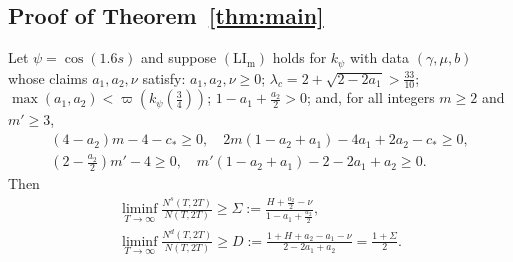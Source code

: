 \subsection{Proof of Theorem~\ref{thm:main}}
\begin{theorem}\label{thm:SigmaD}
Let $\psi=\cos(1.6s)$ and suppose $(\mathrm{LI}_{\mathrm m})$ holds for $k_\psi$ with data $(\gamma,\mu,b)$ whose claims $a_1,a_2,\nu$ satisfy:
$a_1,a_2,\nu\ge0$; $\lambda_c=2+\sqrt{2-2a_1}>\frac{33}{10}$; $\max(a_1,a_2)<\varpi(k_\psi(\frac34))$; $1-a_1+\frac{a_2}2>0$; and, for all integers $m\ge2$
and $m'\ge3$,
\begin{gather*}
(4-a_2)m-4-c_*\ge0,\quad 2m(1-a_2+a_1)-4a_1+2a_2-c_*\ge0,\\
(2-\tfrac{a_2}2)m'-4\ge0,\quad m'(1-a_2+a_1)-2-2a_1+a_2\ge0 .
\end{gather*}
Then
\begin{gather*}
\liminf_{T\to\infty}\frac{N^s(T,2T)}{N(T,2T)}\ge\Sigma:=\frac{H+\frac{a_2}2-\nu}{1-a_1+\frac{a_2}2},\\
\liminf_{T\to\infty}\frac{N^d(T,2T)}{N(T,2T)}\ge D:=\frac{1+H+a_2-a_1-\nu}{2-2a_1+a_2}=\frac{1+\Sigma}2 .
\end{gather*}
\end{theorem}

